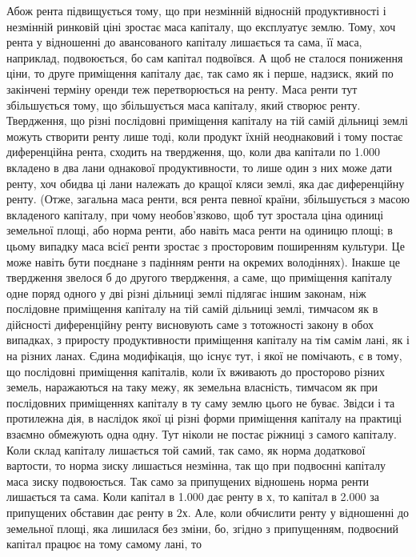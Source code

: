 Абож рента підвищується тому, що при незмінній відносній продуктивності
і незмінній ринковій ціні зростає маса капіталу, що експлуатує землю.
Тому, хоч рента у відношенні до авансованого капіталу лишається та сама, її
маса, наприклад, подвоюється, бо сам капітал подвоївся. А щоб не сталося
пониження ціни, то друге приміщення капіталу дає, так само як і перше,
надзиск, який по закінчені терміну оренди теж перетворюється на ренту. Маса
ренти тут збільшується тому, що збільшується маса капіталу, який створює
ренту. Твердження, що різні послідовні приміщення капіталу на тій самій дільниці
землі можуть створити ренту лише тоді, коли продукт їхній неоднаковий
і тому постає диференційна рента, сходить на твердження, що, коли два капітали
по \num{1.000} вкладено в два лани однакової продуктивности, то
лише один з них може дати ренту, хоч обидва ці лани належать до кращої
кляси землі, яка дає диференційну ренту. (Отже, загальна маса ренти, вся
рента певної країни, збільшується з масою вкладеного капіталу, при чому
необов’язково, щоб тут зростала ціна одиниці земельної площі, або норма
ренти, або навіть маса ренти на одиницю площі; в цьому випадку маса
всієї ренти зростає з просторовим поширенням культури. Це може навіть
бути поєднане з падінням ренти на окремих володіннях). Інакше це твердження
звелося б до другого твердження, а саме, що приміщення капіталу одне
поряд одного у дві різні дільниці землі підлягає іншим законам, ніж послідовне
приміщення капіталу на тій самій дільниці землі, тимчасом як в дійсності
диференційну ренту висновують саме з тотожності закону в обох випадках,
з приросту продуктивности приміщення капіталу на тім самім лані, як і на
різних ланах. Єдина модифікація, що існує тут, і якої не помічають, є в тому,
що послідовні приміщення капіталів, коли їх вживають до просторово різних
земель, наражаються на таку межу, як земельна власність, тимчасом як при послідовних
приміщеннях капіталу в ту саму землю цього не буває. Звідси і та
протилежна дія, в наслідок якої ці різні форми приміщення капіталу на практиці
взаємно обмежують одна одну. Тут ніколи не постає ріжниці з самого капіталу.
Коли склад капіталу лишається той самий, так само, як норма додаткової
вартости, то норма зиску лишається незмінна, так що при подвоєнні
капіталу маса зиску подвоюється. Так само за припущених відношень норма
ренти лишається та сама. Коли капітал в \num{1.000} дає ренту в $х$, то
капітал в \num{2.000} за припущених обставин дає ренту в $2х$. Але, коли
обчислити ренту у відношенні до земельної площі, яка лишилася без зміни, бо,
згідно з припущенням, подвоєний капітал працює на тому самому лані, то
\parbreak{}  %
